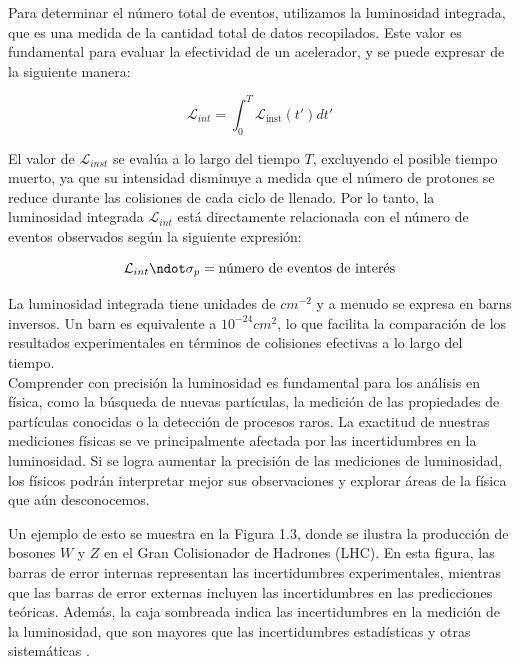 Para determinar el número total de eventos, utilizamos la luminosidad integrada, que es una medida de la cantidad total de datos recopilados. Este valor es fundamental para evaluar la efectividad de un acelerador, y se puede expresar de la siguiente manera:

\begin{equation}
  \mathcal{L}_{int}=\int_{0}^{T} \mathcal {L}_{\text{inst}}(t') dt'
\end{equation}

El valor de $\mathcal{L}_{inst}$ se evalúa a lo largo del tiempo $T$, excluyendo el posible tiempo muerto, ya que su intensidad disminuye a medida que el número de protones se reduce durante las colisiones de cada ciclo de llenado. Por lo tanto, la luminosidad integrada $\mathcal{L}_{int}$ está directamente relacionada con el número de eventos observados según la siguiente expresión:

\begin{equation}
  \mathcal{L}_{int} \ndot \sigma_{p}= \text{número de eventos de interés}
\end{equation}

La luminosidad integrada tiene unidades de $cm^{-2}$ y a menudo se expresa en barns inversos. Un barn es equivalente a $10^{-24}cm^{2}$, lo que facilita la comparación de los resultados experimentales en términos de colisiones efectivas a lo largo del tiempo.\\

Comprender con precisión la luminosidad es fundamental para los análisis en física, como la búsqueda de nuevas partículas, la medición de las propiedades de partículas conocidas o la detección de procesos raros. La exactitud de nuestras mediciones físicas se ve principalmente afectada por las incertidumbres en la luminosidad. Si se logra aumentar la precisión de las mediciones de luminosidad, los físicos podrán interpretar mejor sus observaciones y explorar áreas de la física que aún desconocemos.

Un ejemplo de esto se muestra en la Figura 1.3, donde se ilustra la producción de bosones $W$ y $Z$ en el Gran Colisionador de Hadrones (LHC). En esta figura, las barras de error internas representan las incertidumbres experimentales, mientras que las barras de error externas incluyen las incertidumbres en las predicciones teóricas. Además, la caja sombreada indica las incertidumbres en la medición de la luminosidad, que son mayores que las incertidumbres estadísticas y otras sistemáticas \cite{lumi_uncertainties}.

